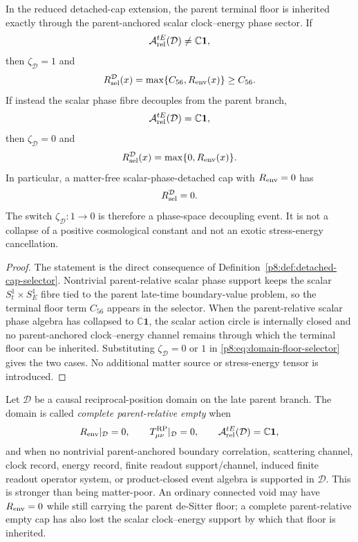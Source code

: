 \documentclass[12pt,a4paper]{article}
\begin{document}
\begin{proposition}
\label{p8:prop:scalar-phase-decoupling-floor}
\leavevmode\par\noindent
In the reduced detached-cap extension, the parent terminal floor is inherited
exactly through the parent-anchored scalar clock--energy phase sector.  If
\[
    \mathcal A^{tE}_{\rm rel}(\mathcal D)\neq\mathbb C\mathbf 1,
\]
then \(\zeta_{\mathcal D}=1\) and
\[
    R_{\rm sel}^{\mathcal D}(x)=\max\{C_{56},R_{\rm env}(x)\}\ge C_{56}.
\]
If instead the scalar phase fibre decouples from the parent branch,
\[
    \mathcal A^{tE}_{\rm rel}(\mathcal D)=\mathbb C\mathbf 1,
\]
then \(\zeta_{\mathcal D}=0\) and
\[
    R_{\rm sel}^{\mathcal D}(x)=\max\{0,R_{\rm env}(x)\}.
\]
In particular, a matter-free scalar-phase-detached cap with \(R_{\rm env}=0\) has
\[
    R_{\rm sel}^{\mathcal D}=0.
\]
The switch \(\zeta_{\mathcal D}:1\to0\) is therefore a phase-space decoupling
event.  It is not a collapse of a positive cosmological constant and not an
exotic stress-energy cancellation.
\end{proposition}

\begin{proof}
The statement is the direct consequence of Definition~\ref{p8:def:detached-cap-selector}.  Nontrivial parent-relative scalar phase support keeps the scalar \(S^1_t\times S^1_E\) fibre tied to the parent late-time boundary-value problem, so the terminal floor term \(C_{56}\) appears in the selector.  When the parent-relative scalar phase algebra has collapsed to \(\mathbb C\mathbf 1\), the scalar action circle is internally closed and no parent-anchored clock--energy channel remains through which the terminal floor can be inherited.  Substituting \(\zeta_{\mathcal D}=0\) or \(1\) in \eqref{p8:eq:domain-floor-selector} gives the two cases.  No additional matter source or stress-energy tensor is introduced.
\end{proof}

\begin{definition}
\label{p8:def:complete-parent-empty-cap}
Let \(\mathcal D\) be a causal reciprocal-position domain on the late parent
branch.  The domain is called \emph{complete parent-relative empty} when
\begin{equation}
\label{p8:eq:complete-empty-cap-conditions}
    R_{\rm env}|_{\mathcal D}=0,
    \qquad
    T^{\rm RP}_{\mu\nu}|_{\mathcal D}=0,
    \qquad
    \mathcal A^{tE}_{\rm rel}(\mathcal D)=\mathbb C\mathbf 1,
\end{equation}
and when no nontrivial parent-anchored boundary correlation, scattering channel,
clock record, energy record, finite readout support/channel, induced finite
readout operator system, or product-closed event algebra is supported in
\(\mathcal D\).  This is stronger than being matter-poor.  An ordinary connected
void may have \(R_{\rm env}=0\) while still carrying the parent de-Sitter floor;
a complete parent-relative empty cap has also lost the scalar clock--energy
support by which that floor is inherited.
\end{definition}
\end{document}
